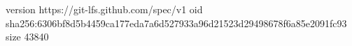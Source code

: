 version https://git-lfs.github.com/spec/v1
oid sha256:6306bf8d5b4459ca177eda7a6d527933a96d21523d29498678f6a85e2091fc93
size 43840
